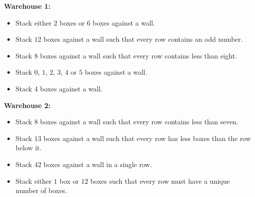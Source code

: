 

\begin{multicols}{2}\raggedcolumns
  \begin{minipage}{\linewidth}
  \begin{center}\textbf{Warehouse 1:}\end{center}
  \begin{itemize}
    \item %
      Stack either \(2\) boxes or \(6\) boxes
      against a wall.

      \vspace{6em}
    \item %
      Stack \(12\) boxes against a wall such that
      every row contains an odd number.

      \vspace{6em}
    \item %
      Stack \(8\) boxes against a wall such that
      every row contains less than eight.

      \vspace{6em}
    \item %
      Stack \(0\), \(1\), \(2\), \(3\), \(4\)
      or \(5\) boxes against a wall.

      \vspace{6em}
    \item %
      Stack \(4\) boxes against a wall.
  \end{itemize}
  \end{minipage}
  \begin{minipage}{\linewidth}
  \begin{center}\textbf{Warehouse 2:}\end{center}
  \begin{itemize}
    \item %
      Stack \(8\) boxes against a wall such that
      every row contains less than seven.

      \vspace{6em}
    \item %
      Stack \(13\) boxes against a wall such that
      every row has less boxes than the row below it.

      \vspace{6em}
    \item %
      Stack \(42\) boxes against a wall in a single row.

      \vspace{6em}
    \item %
      Stack either \(1\) box or \(12\) boxes such that
      every row must have a unique number of boxes.
  \end{itemize}
  \end{minipage}
\end{multicols}


